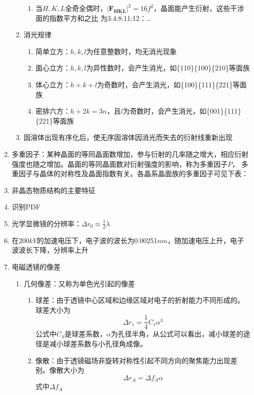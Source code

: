 \documentclass[12pt,a4paper]{article}
\begin{document}
\begin{enumerate}
\begin{enumerate}
\begin{enumerate}
                \item 当$H,K,L$全奇全偶时，$\left|\boldsymbol{F}_{\boldsymbol{H K L}}\right|^{2}=16 f^{2}$，晶面能产生衍射，这些干涉面的指数平方和之比
                    为3:4:8:11:12：\dots
            \end{enumerate}
            \item 消光规律
            \begin{enumerate}
                \item 简单立方：$h,k,l$为任意整数时，均无消光现象
                \item 面心立方：$h,k,l$为异性数时，会产生消光，如\{110\}\{100\}\{210\}等面族
                \item 体心立方：$h+k+l$为奇数时，会产生消光，如\{100\}\{111\}\{221\}等面族
                \item 密排六方：$h+2k=3n$，且$l$为奇数时，会产生消光，如\{001\}\{111\}\{221\}等面族
            \end{enumerate}
            \item 固溶体出现有序化后，使无序固溶体因消光而失去的衍射线重新出现
        \end{enumerate}
        \item 多重因子：某种晶面的等同晶面数增加，参与衍射的几率随之增大，相应衍射强度也随之增加。晶面的等同晶面数对衍射强度的影响，称为多重因子$P$，
            多重因子与晶体的对称性及晶面指数有关。各晶系晶面族的多重因子可见下表：
        \item 非晶态物质结构的主要特征
        \item 识别PDF
        \item 光学显微镜的分辨率：$\Delta r_{0} \approx \frac{1}{2} \lambda$
        \item 在200$kV$的加速电压下，电子波的波长为0.00251$nm$，随加速电压上升，电子波波长下降，分辨率上升
        \item 电磁透镜的像差
        \begin{enumerate}
            \item 几何像差：又称为单色光引起的像差
            \begin{enumerate}
                \item 球差：由于透镜中心区域和边缘区域对电子的折射能力不同形成的。球差大小为$$\Delta r_{s}=\frac{1}{4} C_{s} \alpha^{3}$$
                    公式中$C_{S}$是球差系数，$\alpha$为孔径半角，从公式可以看出，减小球差的途径是减小球差系数与小孔径角成像。
                \item 像散：由于透镜磁场非旋转对称性引起不同方向的聚焦能力出现差别。像散大小为$$\Delta r_{A}=\Delta f_{A} \alpha$$式中$\Delta f_{A}$

\end{enumerate}
\end{enumerate}
\end{enumerate}
\end{document}
